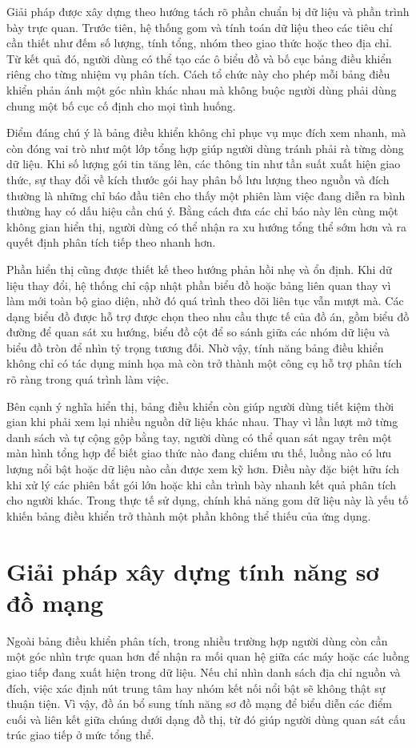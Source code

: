 \documentclass[../DoAn.tex]{subfiles}
\begin{document}
Giải pháp được xây dựng theo hướng tách rõ phần chuẩn bị dữ liệu và phần trình bày trực quan. Trước tiên, hệ thống gom và tính toán dữ liệu theo các tiêu chí cần thiết như đếm số lượng, tính tổng, nhóm theo giao thức hoặc theo địa chỉ. Từ kết quả đó, người dùng có thể tạo các ô biểu đồ và bố cục bảng điều khiển riêng cho từng nhiệm vụ phân tích. Cách tổ chức này cho phép mỗi bảng điều khiển phản ánh một góc nhìn khác nhau mà không buộc người dùng phải dùng chung một bố cục cố định cho mọi tình huống.

Điểm đáng chú ý là bảng điều khiển không chỉ phục vụ mục đích xem nhanh, mà còn đóng vai trò như một lớp tổng hợp giúp người dùng tránh phải rà từng dòng dữ liệu. Khi số lượng gói tin tăng lên, các thông tin như tần suất xuất hiện giao thức, sự thay đổi về kích thước gói hay phân bố lưu lượng theo nguồn và đích thường là những chỉ báo đầu tiên cho thấy một phiên làm việc đang diễn ra bình thường hay có dấu hiệu cần chú ý. Bằng cách đưa các chỉ báo này lên cùng một không gian hiển thị, người dùng có thể nhận ra xu hướng tổng thể sớm hơn và ra quyết định phân tích tiếp theo nhanh hơn.

Phần hiển thị cũng được thiết kế theo hướng phản hồi nhẹ và ổn định. Khi dữ liệu thay đổi, hệ thống chỉ cập nhật phần biểu đồ hoặc bảng liên quan thay vì làm mới toàn bộ giao diện, nhờ đó quá trình theo dõi liên tục vẫn mượt mà. Các dạng biểu đồ được hỗ trợ được chọn theo nhu cầu thực tế của đồ án, gồm biểu đồ đường để quan sát xu hướng, biểu đồ cột để so sánh giữa các nhóm dữ liệu và biểu đồ tròn để nhìn tỷ trọng tương đối. Nhờ vậy, tính năng bảng điều khiển không chỉ có tác dụng minh họa mà còn trở thành một công cụ hỗ trợ phân tích rõ ràng trong quá trình làm việc.

Bên cạnh ý nghĩa hiển thị, bảng điều khiển còn giúp người dùng tiết kiệm thời gian khi phải xem lại nhiều nguồn dữ liệu khác nhau. Thay vì lần lượt mở từng danh sách và tự cộng gộp bằng tay, người dùng có thể quan sát ngay trên một màn hình tổng hợp để biết giao thức nào đang chiếm ưu thế, luồng nào có lưu lượng nổi bật hoặc dữ liệu nào cần được xem kỹ hơn. Điều này đặc biệt hữu ích khi xử lý các phiên bắt gói lớn hoặc khi cần trình bày nhanh kết quả phân tích cho người khác. Trong thực tế sử dụng, chính khả năng gom dữ liệu này là yếu tố khiến bảng điều khiển trở thành một phần không thể thiếu của ứng dụng.

\section{Giải pháp xây dựng tính năng sơ đồ mạng}
Ngoài bảng điều khiển phân tích, trong nhiều trường hợp người dùng còn cần một góc nhìn trực quan hơn để nhận ra mối quan hệ giữa các máy hoặc các luồng giao tiếp đang xuất hiện trong dữ liệu. Nếu chỉ nhìn danh sách địa chỉ nguồn và đích, việc xác định nút trung tâm hay nhóm kết nối nổi bật sẽ không thật sự thuận tiện. Vì vậy, đồ án bổ sung tính năng sơ đồ mạng để biểu diễn các điểm cuối và liên kết giữa chúng dưới dạng đồ thị, từ đó giúp người dùng quan sát cấu trúc giao tiếp ở mức tổng thể.
\end{document}
